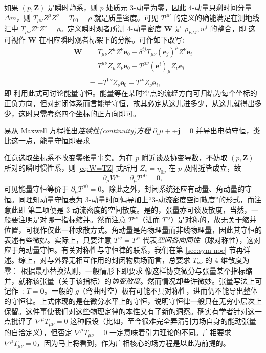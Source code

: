 如果 $(p,\bm Z)$ 是瞬时静系，则 $p$ 处质元 3-动量为零，因此 4-动量只剩时间分量 $\Delta m$，则 $T_{\mu\nu}Z^\mu Z^\nu=T_{00}=\rho$ 就是质量密度。可见 $T^{\mu\nu}$ 的定义的确能满足在测地线汇中 $T_{\mu\nu}Z^\mu Z^\nu=\rho$。定义瞬时观者所测 4-动量密度 $\bm W$ 是 $\rho_{EM},w^i$ 的整合，即
这可视作 $\bm W$ 在相应瞬时观者标架下的分解。可作如下改写:
\begin{align*}
    \bm W
    &=T_{\mu\nu}Z^\mu Z^\nu \bm e_0-\delta^{ij}T_{\mu\nu}(\bm e_j)^\mu Z^\nu\bm e_i\\
    &=T^{\mu\nu}Z_\mu Z_\nu \bm e_0-T^{\mu\nu}(\bm e^i)_\mu Z_\nu\bm e_i\\
    &=-T^{0\nu}Z_\nu\bm e_0-T^{i\nu}Z_\nu\bm e_i,
\end{align*}
即
利用此式可讨论能量守恒。能量等在某时空点的流经方向可归结为每个坐标的正负方向，但对封闭体系而言能量守恒，故其必定从这儿进多少，从这儿就得出多少，这时只需考察四个坐标的正方向即可。

易从 Maxwell 方程推出\textit{连续性(continuity)方程} $\partial_t\mu+\div\bm j=0$ 并导出电荷守恒，类比这一点，能量守恒即要求

任意选取坐标系不改变零张量事实。为在 $p$ 附近谈及协变导数，不妨取 $(p,\bm Z)$ 所对的瞬时惯性系，则 \eqref{eq:W=TZ} 式所用 $Z_\nu=\eta_{0\nu}$ 在 $p$ 及附近皆成立，故
\[
    \partial_\mu W^\mu=\partial_\mu T^{\mu 0}=0,
\]
可见能量守恒等价于 $\partial_\mu T^{\mu 0}=0$。除此之外，封闭系统还应有动量、角动量的守恒。同理知动量守恒表为 3-动量时间偏导加上“3-动流密度空间散度”的形式，而注意此即
第二项便是 3-动流密度的空间散度。是的，张量亦可谈及散度，当然，一般要注明是对哪一指标缩并。然而注意 $T^{\mu\nu}$（进而 $T^{ij}$）是对称的，故无关于缩并位置，可视作仅此一种求散方式。角动量是角物理量而非线物理量，因此其守恒的表述有些微妙。实际上，只要注意 $T^{ij}=T^{ji}$ 代表\textit{空间各向同性}（球对称性），这对应于角动量守恒。有关对称性与守恒律的联系，我们在第 \ref{sec:sym-noe} 节再详述。综上，对与外界无相互作用的封闭物质场而言，总要求 $T_{\mu\nu}$ 的 4 维散度为零：
根据最小替换法则，一般情形下即要求
像这样协变微分与张量某个指标缩并，就称该张量（关于该指标）的\textit{协变散度}。然而情况却些许微妙。张量写法上可记作 $\div T=\bm 0$。一般的 $g$（弯曲时空）极有可能不具对称性，进而仍不能导出整体的守恒律。上式体现的是在微分水平上的守恒，说明守恒律一般只在无穷小层次上保留。这件事使我们对这些物理定律的本性又有了新的洞察。确实有学者针对这一点批评了 $\nabla^\mu T_{\mu\nu}=0$ 这种假设（比如，至今很难完全弄清引力场自身的能动张量的自洽定义），但否定 $\nabla^\mu T_{\mu\nu}=0$ 一定意味着引力理论的不同。广相要求 $\nabla^\mu T_{\mu\nu}=0$，因为马上将看到，作为广相核心的场方程是以此为前提的。

